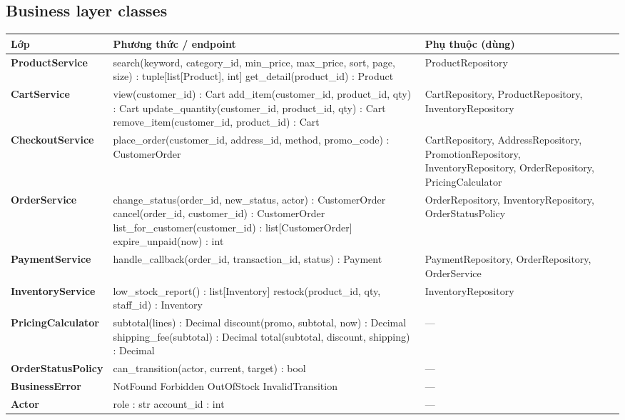 \documentclass[12pt,a4paper,oneside]{report}
\begin{document}
\subsection{Business layer classes}
\begin{longtable}{@{}>{\raggedright\arraybackslash\small\bfseries}p{3.4cm}>{\raggedright\arraybackslash\ttfamily\footnotesize}p{7.2cm}>{\raggedright\arraybackslash\footnotesize}p{4.6cm}@{}}\toprule Lớp & Phương thức / endpoint & Phụ thuộc (dùng)\\\midrule\endhead
ProductService & search(keyword, category\_id, min\_price, max\_price, sort, page, size) : tuple[list[Product], int] \newline get\_detail(product\_id) : Product & ProductRepository\\\midrule
CartService & view(customer\_id) : Cart \newline add\_item(customer\_id, product\_id, qty) : Cart \newline update\_quantity(customer\_id, product\_id, qty) : Cart \newline remove\_item(customer\_id, product\_id) : Cart & CartRepository, ProductRepository, InventoryRepository\\\midrule
CheckoutService & place\_order(customer\_id, address\_id, method, promo\_code) : CustomerOrder & CartRepository, AddressRepository, PromotionRepository, InventoryRepository, OrderRepository, PricingCalculator\\\midrule
OrderService & change\_status(order\_id, new\_status, actor) : CustomerOrder \newline cancel(order\_id, customer\_id) : CustomerOrder \newline list\_for\_customer(customer\_id) : list[CustomerOrder] \newline expire\_unpaid(now) : int & OrderRepository, InventoryRepository, OrderStatusPolicy\\\midrule
PaymentService & handle\_callback(order\_id, transaction\_id, status) : Payment & PaymentRepository, OrderRepository, OrderService\\\midrule
InventoryService & low\_stock\_report() : list[Inventory] \newline restock(product\_id, qty, staff\_id) : Inventory & InventoryRepository\\\midrule
PricingCalculator & subtotal(lines) : Decimal \newline discount(promo, subtotal, now) : Decimal \newline shipping\_fee(subtotal) : Decimal \newline total(subtotal, discount, shipping) : Decimal & ---\\\midrule
OrderStatusPolicy & can\_transition(actor, current, target) : bool & ---\\\midrule
BusinessError & NotFound \newline Forbidden \newline OutOfStock \newline InvalidTransition & ---\\\midrule
Actor & role : str \newline account\_id : int & ---\\\midrule
\bottomrule\end{longtable}
\end{document}
